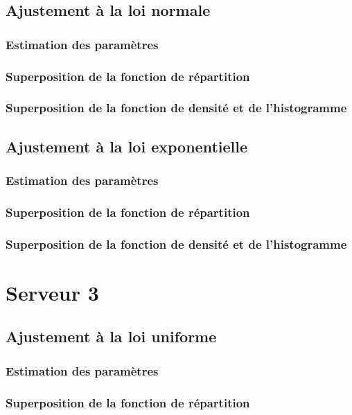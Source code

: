 \documentclass{article}
\begin{document}
\subsection{Ajustement à la loi normale}

\subsubsection{Estimation des paramètres}
\subsubsection{Superposition de la fonction de répartition}
\subsubsection{Superposition de la fonction de densité et de l'histogramme}

\subsection {Ajustement à la loi exponentielle}

\subsubsection{Estimation des paramètres}
\subsubsection{Superposition de la fonction de répartition}
\subsubsection{Superposition de la fonction de densité et de l'histogramme}

\section{Serveur 3}

\subsection{Ajustement à la loi uniforme}

\subsubsection{Estimation des paramètres}
\subsubsection{Superposition de la fonction de répartition}
\end{document}
